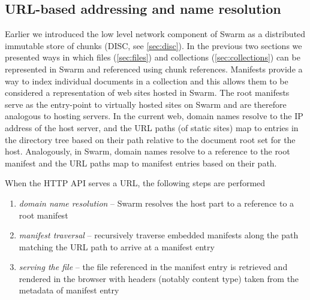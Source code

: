 \subsection{URL-based addressing and name resolution\statusgreen}\label{sec:urls}

Earlier we introduced the low level network component of Swarm as a distributed immutable store of chunks (DISC, see \ref{sec:disc}). In the previous two sections we presented ways in which files (\ref{sec:files}) and collections (\ref{sec:collections}) can be represented in Swarm and referenced using chunk references. Manifests provide a way to index individual documents in a collection and this allows them to be considered a representation of web sites hosted in Swarm. The root manifests serve as the entry-point to virtually hosted sites on Swarm and are therefore analogous to hosting servers. In the current web, domain names resolve to the IP address of the host server, and the URL paths (of static sites) map to entries in the directory tree based on their path relative to the document root set for the host.
Analogously, in Swarm, domain names resolve to a reference to the root manifest and the URL paths map to manifest entries based on their path.  

When the HTTP API serves a URL, the following steps are performed

\begin{enumerate}
    \item \emph{domain name resolution} -- Swarm resolves the host part to a reference to a root manifest
    \item \emph{manifest traversal} -- recursively traverse embedded manifests along the path matching the URL path to arrive at a manifest entry
    \item \emph{serving the file} -- the file referenced in the manifest entry is retrieved and rendered in the browser with headers (notably content type) taken from  the metadata of manifest entry
\end{enumerate}

